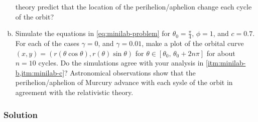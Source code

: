 \documentclass[12pt,twoside]{article}
\begin{document}
\begin{enumerate}[(a)]
  theory predict that the location of the perihelion/aphelion change each cycle
  of the orbit?
\item Simulate the equations in \cref{eq:minilab-problem} for
  $\theta_0=\frac{\pi}{4}$, $\phi=1$, and $c=0.7$. For each of the cases
  $\gamma=0$, and $\gamma=0.01$, make a plot of the orbital curve
  $(x,y)=(r(\theta\cos\theta),r(\theta)\sin\theta)$ for
  $\theta\in[\theta_0,\,\theta_0+2n\pi]$  for about $n=10$ cycles. Do the
  simulations agree with your analysis in \cref{itm:minilab-b,itm:minilab-c}?
  Astronomical observations show that the perihelion/aphelion of Murcury advance
  with each sysle of the orbit in agreement with the relativistic theory.
\end{enumerate}

\subsubsection*{Solution}
\todo{}
\end{document}
